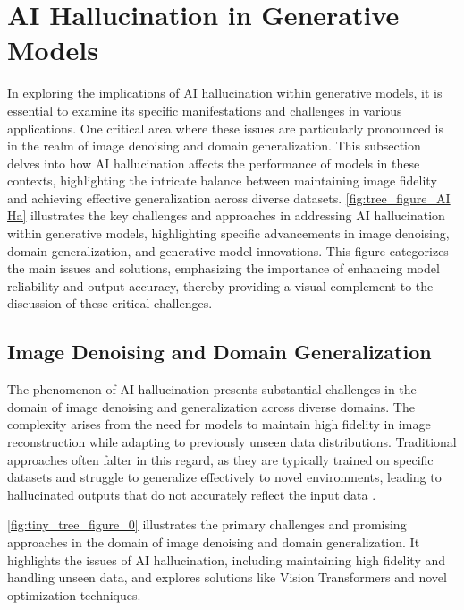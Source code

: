 \section{AI Hallucination in Generative Models} \label{sec:AI Hallucination in Generative Models}


In exploring the implications of AI hallucination within generative models, it is essential to examine its specific manifestations and challenges in various applications. One critical area where these issues are particularly pronounced is in the realm of image denoising and domain generalization. This subsection delves into how AI hallucination affects the performance of models in these contexts, highlighting the intricate balance between maintaining image fidelity and achieving effective generalization across diverse datasets. \autoref{fig:tree_figure_AI Ha} illustrates the key challenges and approaches in addressing AI hallucination within generative models, highlighting specific advancements in image denoising, domain generalization, and generative model innovations. This figure categorizes the main issues and solutions, emphasizing the importance of enhancing model reliability and output accuracy, thereby providing a visual complement to the discussion of these critical challenges.


 






\subsection{Image Denoising and Domain Generalization} \label{subsec:Image Denoising and Domain Generalization}

The phenomenon of AI hallucination presents substantial challenges in the domain of image denoising and generalization across diverse domains. The complexity arises from the need for models to maintain high fidelity in image reconstruction while adapting to previously unseen data distributions. Traditional approaches often falter in this regard, as they are typically trained on specific datasets and struggle to generalize effectively to novel environments, leading to hallucinated outputs that do not accurately reflect the input data \cite{park2023domainadaptationbasedhuman}.

\autoref{fig:tiny_tree_figure_0} illustrates the primary challenges and promising approaches in the domain of image denoising and domain generalization. It highlights the issues of AI hallucination, including maintaining high fidelity and handling unseen data, and explores solutions like Vision Transformers and novel optimization techniques.

